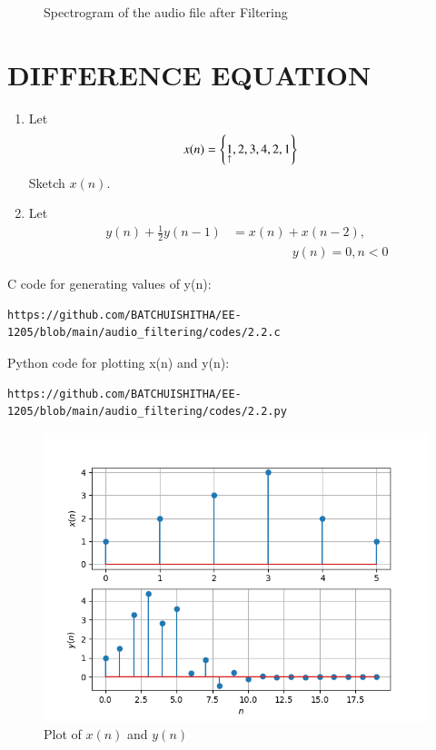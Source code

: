\documentclass[journal,12pt,twocolumn]{IEEEtran}
\theoremstyle{remark}
\begin{document}
\begin{enumerate}[label=\thesection\arabic*.,ref=\thesection.\theenumi]
\begin{figure}[ht]
    \caption{Spectrogram of the audio file after Filtering}
    \label{fig:afterfiltering}
\end{figure}
\end{enumerate}

\section{DIFFERENCE EQUATION}
\begin{enumerate}[label=\thesection\arabic*.,ref=\thesection.\theenumi]
\item Let
\begin{align}
x(n) &= \left\{\underset{\uparrow}{1},2,3,4,2,1\right\}
\end{align}
Sketch $x(n)$.
\item Let 
\begin{align}
y(n) +\frac{1}{2}y(n-1) &= x(n) + x(n-2), \label{2.2}\nonumber \\
& \hspace{2cm} y(n)=0, n<0
\end{align}
\end{enumerate}
\solution  C code for generating values of y(n):
\begin{lstlisting}
https://github.com/BATCHUISHITHA/EE-1205/blob/main/audio_filtering/codes/2.2.c
\end{lstlisting} 
Python code for plotting x(n) and y(n):
\begin{lstlisting}
https://github.com/BATCHUISHITHA/EE-1205/blob/main/audio_filtering/codes/2.2.py
\end{lstlisting}
\begin{figure}[ht]
	\centering
	\includegraphics[width=\columnwidth]{figs/2.2.png}
	\caption{Plot of $x(n)$ and $y(n)$}
	\label{fig:2.2}
\end{figure}
\end{document}
